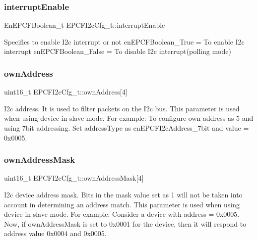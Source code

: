 \subsubsection{\texorpdfstring{interrupt\+Enable}{interruptEnable}}
{\footnotesize\ttfamily En\+E\+P\+C\+F\+Boolean\+\_\+t E\+P\+C\+F\+I2c\+Cfg\+\_\+t\+::interrupt\+Enable}

Specifies to enable I2c interrupt or not en\+E\+P\+C\+F\+Boolean\+\_\+\+True = To enable I2c interrupt en\+E\+P\+C\+F\+Boolean\+\_\+\+False = To disable I2c interrupt(polling mode) \mbox{\label{structEPCFI2cCfg__t_a555a4c5296c0c6822093aaa0138210fa}} 
\subsubsection{\texorpdfstring{own\+Address}{ownAddress}}
{\footnotesize\ttfamily uint16\+\_\+t E\+P\+C\+F\+I2c\+Cfg\+\_\+t\+::own\+Address\mbox{[}4\mbox{]}}

I2c address. It is used to filter packets on the I2c bus. This parameter is used when using device in slave mode. For example\+: To configure own address as 5 and using 7bit addressing. Set address\+Type as en\+E\+P\+C\+F\+I2c\+Address\+\_\+7bit and value = 0x0005. \mbox{\label{structEPCFI2cCfg__t_a2efb97b4637d6b1ef818af955e10d535}} 
\subsubsection{\texorpdfstring{own\+Address\+Mask}{ownAddressMask}}
{\footnotesize\ttfamily uint16\+\_\+t E\+P\+C\+F\+I2c\+Cfg\+\_\+t\+::own\+Address\+Mask\mbox{[}4\mbox{]}}

I2c device address mask. Bits in the mask value set as 1 will not be taken into account in determining an address match. This parameter is used when using device in slave mode. For example\+: Consider a device with address = 0x0005. Now, if own\+Address\+Mask is set to 0x0001 for the device, then it will respond to address value 0x0004 and 0x0005. \mbox{\label{structEPCFI2cCfg__t_aba06d6840c5c10f64da13828ea288bc5}} 
